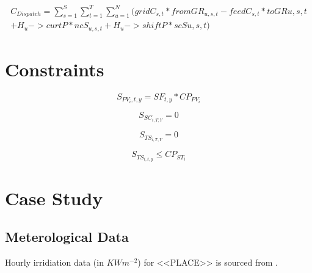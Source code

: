 \documentclass[
	11pt,								%
	DIV10,								%
	a4paper,         					%
	oneside,							%
	headheight=20pt,					%
	footheight=20pt,					%
    parskip=full,						%
    listof=totoc,						%
	bibliography=totoc,					%
	index=totoc,						%
]{scrartcl}
\begin{document}
\begin{equation}
	\begin{split}
		C_{Dispatch} = \sum_{s=1}^{S}\sum_{t=1}^{T}\sum_{u=1}^{N}(gridC_{s,t} * fromGR_{u,s,t} - feedC_{s,t} * toGR{u,s,t}\\
		+ H_u->curtP * ncS_{u,s,t} + H_u->shiftP * scS{u,s,t})
	\end{split}
\end{equation}



	\section*{Constraints}
	
	\begin{equation}
		S_{PV_i,t,y} = SF_{t,y} * CP_{PV_i}
	\end{equation}
	 
	 \begin{equation}
	 		S_{SC_{i,T,Y}} = 0 
	 \end{equation}
	
	 \begin{equation}
	 		S_{TS_{i,T,Y}} = 0 
	 \end{equation}
	
	 \begin{equation}
	 		S_{TS_{i,t,y}} \leq  CP_{ST_i}
	 \end{equation}


\newpage
\section{Case Study}
\subsection{Meterological Data}
Hourly irridiation data (in $KWm^{-2}$) for <<PLACE>> is sourced from \cite{pfenningerLongtermPatternsEuropean2016}. 
\end{document}

